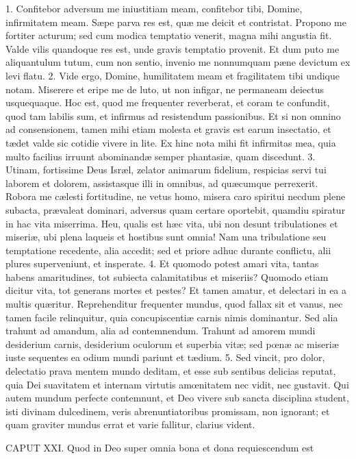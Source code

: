 1. Confitebor adversum me iniustitiam meam, confitebor tibi, Domine, infirmitatem meam. Sæpe parva res est, quæ me deicit et contristat. Propono me fortiter acturum; sed cum modica temptatio venerit, magna mihi angustia fit. Valde vilis quandoque res est, unde gravis temptatio provenit. Et dum puto me aliquantulum tutum, cum non sentio, invenio me nonnumquam pæne devictum ex levi flatu.
2. Vide ergo, Domine, humilitatem meam et fragilitatem tibi undique notam. Miserere et eripe me de luto, ut non infigar, ne permaneam deiectus usquequaque. Hoc est, quod me frequenter reverberat, et coram te confundit, quod tam labilis sum, et infirmus ad resistendum passionibus. Et si non omnino ad consensionem, tamen mihi etiam molesta et gravis est earum insectatio, et tædet valde sic cotidie vivere in lite. Ex hinc nota mihi fit infirmitas mea, quia multo facilius irruunt abominandæ semper phantasiæ, quam discedunt.
3. Utinam, fortissime Deus Isræl, zelator animarum fidelium, respicias servi tui laborem et dolorem, assistasque illi in omnibus, ad quæcumque perrexerit. Robora me cælesti fortitudine, ne vetus homo, misera caro spiritui necdum plene subacta, prævaleat dominari, adversus quam certare oportebit, quamdiu spiratur in hac vita miserrima. Heu, qualis est hæc vita, ubi non desunt tribulationes et miseriæ, ubi plena laqueis et hostibus sunt omnia! Nam una tribulatione seu temptatione recedente, alia accedit; sed et priore adhuc durante conflictu, alii plures superveniunt, et insperate.
4. Et quomodo potest amari vita, tantas habens amaritudines, tot subiecta calamitatibus et miseriis? Quomodo etiam dicitur vita, tot generans mortes et pestes? Et tamen amatur, et delectari in ea a multis quæritur. Reprehenditur frequenter mundus, quod fallax sit et vanus, nec tamen facile relinquitur, quia concupiscentiæ carnis nimis dominantur. Sed alia trahunt ad amandum, alia ad contemnendum. Trahunt ad amorem mundi desiderium carnis, desiderium oculorum et superbia vitæ; sed pœnæ ac miseriæ iuste sequentes ea odium mundi pariunt et tædium.
5. Sed vincit, pro dolor, delectatio prava mentem mundo deditam, et esse sub sentibus delicias reputat, quia Dei suavitatem et internam virtutis amœnitatem nec vidit, nec gustavit. Qui autem mundum perfecte contemnunt, et Deo vivere sub sancta disciplina student, isti divinam dulcedinem, veris abrenuntiatoribus promissam, non ignorant; et quam graviter mundus errat et varie fallitur, clarius vident.


CAPUT XXI.
Quod in Deo super omnia bona et dona requiescendum est

